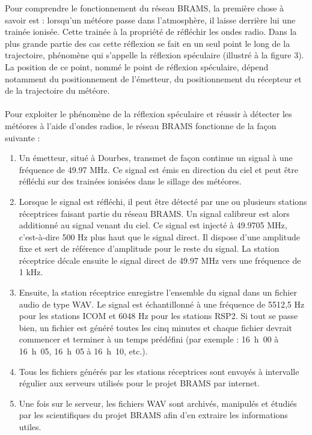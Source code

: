 \documentclass[11pt]{article}
\begin{document}
Pour comprendre le fonctionnement du réseau BRAMS, la première chose à savoir est : lorsqu'un météore passe dans l'atmosphère, il laisse derrière lui une trainée ionisée.
Cette trainée à la propriété de réfléchir les ondes radio.
Dans la plus grande partie des cas cette réflexion se fait en un seul point le long de la trajectoire, phénomène qui s'appelle la réflexion spéculaire (illustré à la figure 3).
La position de ce point, nommé le point de réflexion spéculaire, dépend notamment du positionnement de l'émetteur, du positionnement du récepteur et de la trajectoire du météore.\\
\\
Pour exploiter le phénomène de la réflexion spéculaire et réussir à détecter les météores à l'aide d'ondes radios, le réseau BRAMS fonctionne de la façon suivante :
\begin{enumerate}
    \item Un émetteur, situé à Dourbes, transmet de façon continue un signal à une fréquence de 49.97 MHz.
          Ce signal est émis en direction du ciel et peut être réfléchi sur des trainées ionisées dans le sillage des météores.
    \item Lorsque le signal est réfléchi, il peut être détecté par une ou plusieurs stations réceptrices faisant partie du réseau BRAMS.
          Un signal calibreur est alors additionné au signal venant du ciel.
          Ce signal est injecté à 49.9705 MHz, c'est-à-dire 500 Hz plus haut que le signal direct.
          Il dispose d'une amplitude fixe et sert de référence d'amplitude pour le reste du signal.
          La station réceptrice décale ensuite le signal direct de 49.97 MHz vers une fréquence de 1 kHz.
    \item Ensuite, la station réceptrice enregistre l'ensemble du signal dans un fichier audio de type WAV.
          Le signal est échantillonné à une fréquence de 5512,5 Hz pour les stations ICOM et 6048 Hz pour les stations RSP2.
          Si tout se passe bien, un fichier est généré toutes les cinq minutes et chaque fichier devrait commencer et terminer à un temps prédéfini (par exemple : 16 h 00 à 16 h 05, 16 h 05 à 16 h 10, etc.).
    \item Tous les fichiers générés par les stations réceptrices sont envoyés à intervalle régulier aux serveurs utilisés pour le projet BRAMS par internet.
    \item Une fois sur le serveur, les fichiers WAV sont archivés, manipulés et étudiés par les scientifiques du projet BRAMS afin d'en extraire les informations utiles.
\end{enumerate}
\end{document}
